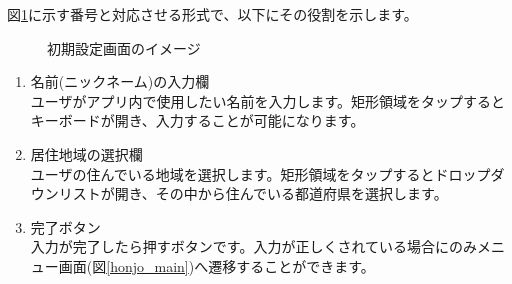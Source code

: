 \documentclass[a4j]{jarticle}
\begin{document}
図\ref{honjo_setup}に示す番号と対応させる形式で、以下にその役割を示します。

\begin{figure}[H]
    \begin{center}
    \caption {初期設定画面のイメージ}
    \label{honjo_setup}
    \end{center}
\end{figure}

\begin{enumerate}
  \renewcommand{\labelenumi}{\textcircled{\scriptsize \theenumi}}
  \item 名前(ニックネーム)の入力欄\\
        ユーザがアプリ内で使用したい名前を入力します。矩形領域をタップするとキーボードが開き、入力することが可能になります。
  \item 居住地域の選択欄\\
        ユーザの住んでいる地域を選択します。矩形領域をタップするとドロップダウンリストが開き、その中から住んでいる都道府県を選択します。
  \item 完了ボタン\\
        入力が完了したら押すボタンです。入力が正しくされている場合にのみメニュー画面(図\ref{honjo_main})へ遷移することができます。
\end{enumerate}
\end{document}
